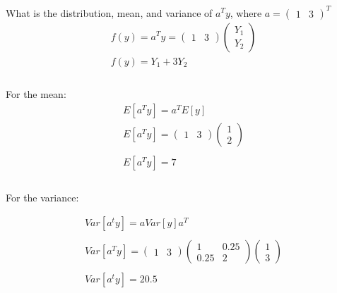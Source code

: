 \documentclass{exam}
\begin{document}
What is the distribution, mean, and variance of $a^Ty$, where $a =\begin{pmatrix} 1 & 3 \end{pmatrix}^T $
\\
\begin{equation}
\begin{gathered}
f(y) =a^Ty = \begin{pmatrix} 1 & 3 \end{pmatrix} \begin{pmatrix} Y_1 \\ Y_2 \end{pmatrix}\\
f(y) = Y_1 + 3Y_2
\\
\end{gathered}
\end{equation}
\\
For the mean: 
\begin{equation}
\begin{gathered}
E[a^Ty] = a^TE[y]\\
E[a^Ty] = \begin{pmatrix} 1 & 3 \end{pmatrix} \begin{pmatrix} 1 \\ 2 \end{pmatrix}\\
\\
E[a^Ty] = 7
\\
\end{gathered}
\end{equation}
\\
For the variance: 

\begin{equation}
\begin{gathered}
Var[a^ty] = aVar[y]a^T\\
\\
Var[a^Ty] = 
\begin{pmatrix}1 & 3\end{pmatrix}
\begin{pmatrix} 1 & 0.25 \\ 0.25 & 2 \end{pmatrix} 
\begin{pmatrix} 1 \\ 3 \end{pmatrix}\\
\\
Var[a^ty] = 20.5
\end{gathered}
\end{equation}
\end{document}
